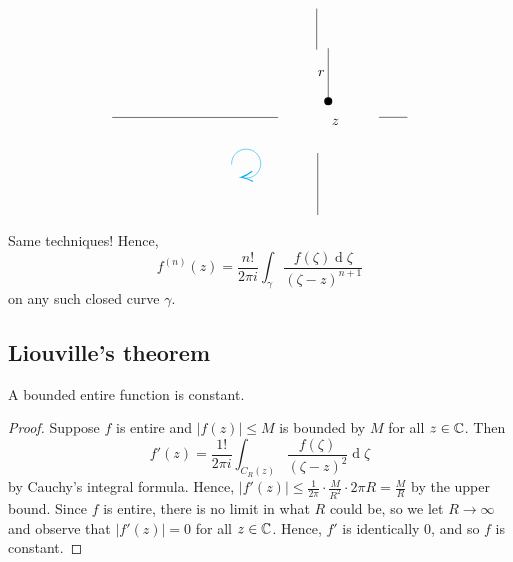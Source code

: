 \documentclass[12pt]{article}
\renewcommand{\d}{\ensuremath{\operatorname{d}}}
\begin{document}
\[\begin{tikzpicture}[x=0.75pt,y=0.75pt,yscale=-1,xscale=1]
    \draw    (315.02,97.83) -- (315.02,148.43) ;
    \draw [shift={(315.02,148.43)}, rotate = 90] [color=black  ][fill=black  ][line width=0.75]      (0, 0) circle [x radius= 3.35, y radius= 3.35]   ;
    \draw    (109.26,164) -- (267.26,164) ;
    \draw    (363.26,163.86) -- (390.41,163.86) ;
    \draw    (305,198) -- (305,257.26) ;
    \draw    (304,60) -- (304,99.26) ;
    \draw  [draw opacity=0] (232.12,221.17) .. controls (233.6,221.71) and (235.2,222) .. (236.87,222) .. controls (244.53,222) and (250.74,215.79) .. (250.74,208.13) .. controls (250.74,200.47) and (244.53,194.26) .. (236.87,194.26) .. controls (229.21,194.26) and (223,200.47) .. (223,208.13) .. controls (223,208.44) and (223.01,208.74) .. (223.03,209.05) -- (236.87,208.13) -- cycle ; \draw [color=cyan  ,draw opacity=1 ]   (234.05,221.71) .. controls (234.96,221.9) and (235.9,222) .. (236.87,222) .. controls (244.53,222) and (250.74,215.79) .. (250.74,208.13) .. controls (250.74,200.47) and (244.53,194.26) .. (236.87,194.26) .. controls (229.21,194.26) and (223,200.47) .. (223,208.13) .. controls (223,208.44) and (223.01,208.74) .. (223.03,209.05) ;  \draw [shift={(232.12,221.17)}, rotate = 355.35] [color=cyan  ,draw opacity=1 ][line width=0.75]    (10.93,-4.9) .. controls (6.95,-2.3) and (3.31,-0.67) .. (0,0) .. controls (3.31,0.67) and (6.95,2.3) .. (10.93,4.9)   ;
    
    \draw (317.21,164.09) node [anchor=north west][inner sep=0.75pt]    {$z$};
    \draw (303.95,117.47) node [anchor=north west][inner sep=0.75pt]    {$r$};
    
    
    \end{tikzpicture}
    \]
Same techniques! Hence, \[f^{(n)}(z) = \frac{n!}{2\pi i}\int_{\gamma}\frac{f(\zeta)\d \zeta}{(\zeta-z)^{n+1}}\] on any such closed curve $\gamma$.

\subsection{Liouville's theorem}
\begin{theorem}[Liouville's]
    A bounded entire function  is constant.
\end{theorem}
\begin{proof}
    Suppose $f$ is entire and $|f(z)|\leq M$ is bounded by $M$ for all $z\in \mathbb{C}$. Then \[f'(z)=\frac{1!}{2\pi i}\int_{C_R(z)}\frac{f(\zeta)}{(\zeta-z)^2}\d \zeta\] by Cauchy's integral formula. Hence, $|f'(z)|\leq \frac{1}{2\pi}\cdot \frac{M}{R^2}\cdot 2\pi R=\frac{M}{R}$ by the upper bound. Since $f$ is entire, there is no limit in what $R$ could be, so we let $R\to \infty$ and observe that $|f'(z)|=0$ for all $z\in \mathbb{C}$. Hence, $f'$ is identically 0, and so $f$ is constant.
\end{proof}
\end{document}
